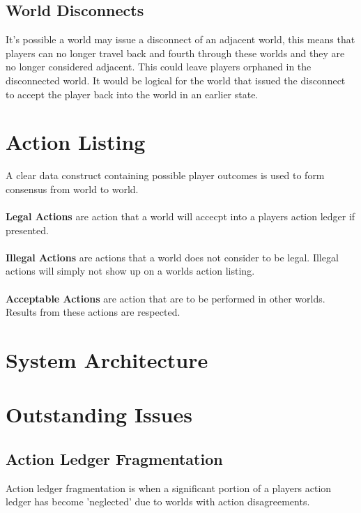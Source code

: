\documentclass[runningheads,a4paper]{llncs}
\begin{document}
\subsection{World Disconnects}
\label{WD}
It's possible a world may issue a disconnect of an adjacent world, this means that players can no longer travel back and fourth through these worlds and they are no longer considered adjacent. This could leave players orphaned in the disconnected world. It would be logical for the world that issued the disconnect to accept the player back into the world in an earlier state.

\section{Action Listing}
A clear data construct containing possible player outcomes is used to form consensus from world to world.
\\\\
\textbf{Legal Actions} are action that a world will accecpt into a players action ledger if presented.
\\\\
\textbf{Illegal Actions} are actions that a world does not consider to be legal. Illegal actions will simply not show up on a worlds action listing.
\\\\
\textbf{Acceptable Actions} are action that are to be performed in other worlds. Results from these actions are respected.

\section{System Architecture}
\begin{center}
\end{center}

\section{Outstanding Issues}
\subsection{Action Ledger Fragmentation}
\label{ALF}
Action ledger fragmentation is when a significant portion of a players action ledger has become 'neglected' due to worlds with action disagreements. 
\end{document}
